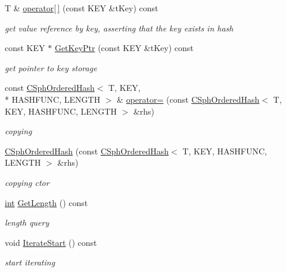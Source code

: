 \begin{DoxyCompactItemize}
T \& \hyperlink{classCSphOrderedHash_ad3713e8c0937d3b989426f63676046ab}{operator\mbox{[}$\,$\mbox{]}} (const K\-E\-Y \&t\-Key) const 
\begin{DoxyCompactList}\small\item\em get value reference by key, asserting that the key exists in hash \end{DoxyCompactList}\item 
const K\-E\-Y $\ast$ \hyperlink{classCSphOrderedHash_a4c57820dcaafe32df0943c58ad5f6c68}{Get\-Key\-Ptr} (const K\-E\-Y \&t\-Key) const 
\begin{DoxyCompactList}\small\item\em get pointer to key storage \end{DoxyCompactList}\item 
const \hyperlink{classCSphOrderedHash}{C\-Sph\-Ordered\-Hash}$<$ T, K\-E\-Y, \\*
H\-A\-S\-H\-F\-U\-N\-C, L\-E\-N\-G\-T\-H $>$ \& \hyperlink{classCSphOrderedHash_ac52e2d520e9a7756a3cde32784e160b5}{operator=} (const \hyperlink{classCSphOrderedHash}{C\-Sph\-Ordered\-Hash}$<$ T, K\-E\-Y, H\-A\-S\-H\-F\-U\-N\-C, L\-E\-N\-G\-T\-H $>$ \&rhs)
\begin{DoxyCompactList}\small\item\em copying \end{DoxyCompactList}\item 
\hyperlink{classCSphOrderedHash_a85cf6456a6e3923c67a83cca0ed314d7}{C\-Sph\-Ordered\-Hash} (const \hyperlink{classCSphOrderedHash}{C\-Sph\-Ordered\-Hash}$<$ T, K\-E\-Y, H\-A\-S\-H\-F\-U\-N\-C, L\-E\-N\-G\-T\-H $>$ \&rhs)
\begin{DoxyCompactList}\small\item\em copying ctor \end{DoxyCompactList}\item 
\hyperlink{sphinxexpr_8cpp_a4a26e8f9cb8b736e0c4cbf4d16de985e}{int} \hyperlink{classCSphOrderedHash_aadac9e6282da402174cf8f6ab6cde3b8}{Get\-Length} () const 
\begin{DoxyCompactList}\small\item\em length query \end{DoxyCompactList}\item 
void \hyperlink{classCSphOrderedHash_aee66899d08410d19ec645d9ea381ff02}{Iterate\-Start} () const 
\begin{DoxyCompactList}\small\item\em start iterating \end{DoxyCompactList}\item 

\end{DoxyCompactItemize}

